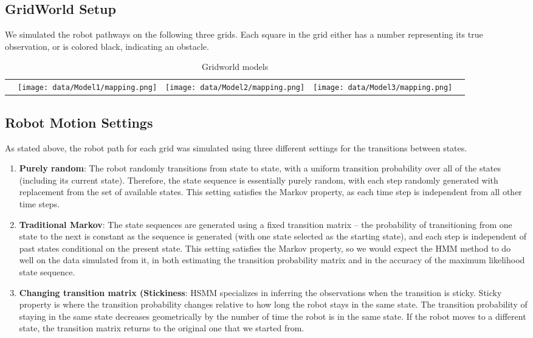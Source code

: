 \documentclass{article}
\begin{document}
\subsection{GridWorld Setup}

We simulated the robot pathways on the following three grids. Each square in the grid either has a number representing its true observation, or is colored black, indicating an obstacle.

\newcommand{\addmapa}{\texttt{[image: data/Model1/mapping.png]}}
\newcommand{\addmapb}{\texttt{[image: data/Model2/mapping.png]}}
\newcommand{\addmapc}{\texttt{[image: data/Model3/mapping.png]}}
\begin{table}[H]
\sffamily
\centering
\begin{tabular}{l*4{C}@{}}
& \addmapa & \addmapb & \addmapc \\
\end{tabular}
\caption{Gridworld models}
\end{table} 


\subsection{Robot Motion Settings}

As stated above, the robot path for each grid was simulated using three different settings for the transitions between states.

\begin{enumerate}
	\item \textbf{Purely random}: The robot randomly transitions from state to state, with a uniform transition probability over all of the states (including its current state). Therefore, the state sequence is essentially purely random, with each step randomly generated with replacement from the set of available states. This setting satisfies the Markov property, as each time step is independent from all other time steps.
	\item \textbf{Traditional Markov}: The state sequences are generated using a fixed transition matrix -- the probability of transitioning from one state to the next is constant as the sequence is generated (with one state selected as the starting state), and each step is independent of past states conditional on the present state. This setting satisfies the Markov property, so we would expect the HMM method to do well on the data simulated from it, in both estimating the transition probability matrix and in the accuracy of the maximum likelihood state sequence.
	\item \textbf{Changing transition matrix (Stickiness}: HSMM specializes in inferring the observations when the transition is sticky. Sticky property is where the transition probability changes relative to how long the robot stays in the same state. The transition probability of staying in the same state decreases geometrically by the number of time the robot is in the same state. If the robot moves to a different state, the transition matrix returns to the original one that we started from.
 \end{enumerate}
\end{document}
